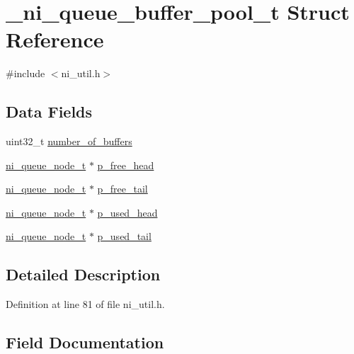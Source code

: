 \hypertarget{struct__ni__queue__buffer__pool__t}{}\section{\+\_\+ni\+\_\+queue\+\_\+buffer\+\_\+pool\+\_\+t Struct Reference}
\label{struct__ni__queue__buffer__pool__t}


{\ttfamily \#include $<$ni\+\_\+util.\+h$>$}

\subsection*{Data Fields}
\begin{DoxyCompactItemize}
\item 
uint32\+\_\+t \mbox{\hyperlink{struct__ni__queue__buffer__pool__t_aa395e0bf9ca757f1a1d117c8bc6339fb}{number\+\_\+of\+\_\+buffers}}
\item 
\mbox{\hyperlink{ni__util_8h_aecbc45db1f33b1a7eb1b32a6be3e7cce}{ni\+\_\+queue\+\_\+node\+\_\+t}} $\ast$ \mbox{\hyperlink{struct__ni__queue__buffer__pool__t_aa3ecc274504a884f122380925421fb5f}{p\+\_\+free\+\_\+head}}
\item 
\mbox{\hyperlink{ni__util_8h_aecbc45db1f33b1a7eb1b32a6be3e7cce}{ni\+\_\+queue\+\_\+node\+\_\+t}} $\ast$ \mbox{\hyperlink{struct__ni__queue__buffer__pool__t_af24079bd64993ac48b294128fb0b05ab}{p\+\_\+free\+\_\+tail}}
\item 
\mbox{\hyperlink{ni__util_8h_aecbc45db1f33b1a7eb1b32a6be3e7cce}{ni\+\_\+queue\+\_\+node\+\_\+t}} $\ast$ \mbox{\hyperlink{struct__ni__queue__buffer__pool__t_ad0808e52a9d7de33af207ab6551cbd3a}{p\+\_\+used\+\_\+head}}
\item 
\mbox{\hyperlink{ni__util_8h_aecbc45db1f33b1a7eb1b32a6be3e7cce}{ni\+\_\+queue\+\_\+node\+\_\+t}} $\ast$ \mbox{\hyperlink{struct__ni__queue__buffer__pool__t_a74da1fe945fd27fdfd4d644670f29058}{p\+\_\+used\+\_\+tail}}
\end{DoxyCompactItemize}


\subsection{Detailed Description}


Definition at line 81 of file ni\+\_\+util.\+h.



\subsection{Field Documentation}
\mbox{\label{struct__ni__queue__buffer__pool__t_aa395e0bf9ca757f1a1d117c8bc6339fb}} 
